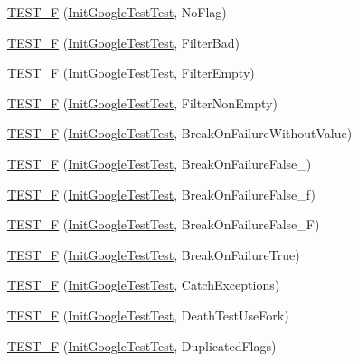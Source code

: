 \begin{DoxyCompactItemize}
\hyperlink{namespacetesting_add96563b5ca11c20fe2766a848c2bb63}{T\-E\-S\-T\-\_\-\-F} (\hyperlink{classtesting_1_1_init_google_test_test}{Init\-Google\-Test\-Test}, No\-Flag)
\item 
\hyperlink{namespacetesting_ab368a135e5a7a59bceb912a5f636004a}{T\-E\-S\-T\-\_\-\-F} (\hyperlink{classtesting_1_1_init_google_test_test}{Init\-Google\-Test\-Test}, Filter\-Bad)
\item 
\hyperlink{namespacetesting_a04d011d2e5695513c45216ae1b98095b}{T\-E\-S\-T\-\_\-\-F} (\hyperlink{classtesting_1_1_init_google_test_test}{Init\-Google\-Test\-Test}, Filter\-Empty)
\item 
\hyperlink{namespacetesting_a69dcb047e8cf4f93e8132faf11ba7110}{T\-E\-S\-T\-\_\-\-F} (\hyperlink{classtesting_1_1_init_google_test_test}{Init\-Google\-Test\-Test}, Filter\-Non\-Empty)
\item 
\hyperlink{namespacetesting_afc3e46c96f27aa2b502b15e8e4bab2ca}{T\-E\-S\-T\-\_\-\-F} (\hyperlink{classtesting_1_1_init_google_test_test}{Init\-Google\-Test\-Test}, Break\-On\-Failure\-Without\-Value)
\item 
\hyperlink{namespacetesting_abd2b3ac615374fbe560ba35be4c4e928}{T\-E\-S\-T\-\_\-\-F} (\hyperlink{classtesting_1_1_init_google_test_test}{Init\-Google\-Test\-Test}, Break\-On\-Failure\-False\-\_)
\item 
\hyperlink{namespacetesting_abb038e044a4f2142414624e482b48eeb}{T\-E\-S\-T\-\_\-\-F} (\hyperlink{classtesting_1_1_init_google_test_test}{Init\-Google\-Test\-Test}, Break\-On\-Failure\-False\-\_\-f)
\item 
\hyperlink{namespacetesting_aec19373865e49dbd1fe7f22c8db4a256}{T\-E\-S\-T\-\_\-\-F} (\hyperlink{classtesting_1_1_init_google_test_test}{Init\-Google\-Test\-Test}, Break\-On\-Failure\-False\-\_\-\-F)
\item 
\hyperlink{namespacetesting_aaf881d7ee8cfa238e9a66d0562937fde}{T\-E\-S\-T\-\_\-\-F} (\hyperlink{classtesting_1_1_init_google_test_test}{Init\-Google\-Test\-Test}, Break\-On\-Failure\-True)
\item 
\hyperlink{namespacetesting_af59442310531cd96d8aa3ce5acb2d025}{T\-E\-S\-T\-\_\-\-F} (\hyperlink{classtesting_1_1_init_google_test_test}{Init\-Google\-Test\-Test}, Catch\-Exceptions)
\item 
\hyperlink{namespacetesting_aa5259681257cd3654f34dc81212c82bc}{T\-E\-S\-T\-\_\-\-F} (\hyperlink{classtesting_1_1_init_google_test_test}{Init\-Google\-Test\-Test}, Death\-Test\-Use\-Fork)
\item 
\hyperlink{namespacetesting_a34b640eb46cf4189bed01f18d42d3277}{T\-E\-S\-T\-\_\-\-F} (\hyperlink{classtesting_1_1_init_google_test_test}{Init\-Google\-Test\-Test}, Duplicated\-Flags)

\end{DoxyCompactItemize}
